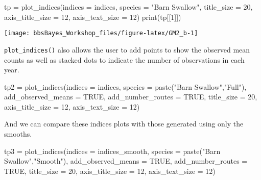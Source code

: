 \documentclass[
]{book}
\newenvironment{Shaded}{\begin{snugshade}}{\end{snugshade}}
\newcommand{\AttributeTok}[1]{\textcolor[rgb]{0.77,0.63,0.00}{#1}}
\newcommand{\ConstantTok}[1]{\textcolor[rgb]{0.00,0.00,0.00}{#1}}
\newcommand{\DecValTok}[1]{\textcolor[rgb]{0.00,0.00,0.81}{#1}}
\newcommand{\FunctionTok}[1]{\textcolor[rgb]{0.00,0.00,0.00}{#1}}
\newcommand{\NormalTok}[1]{#1}
\newcommand{\OtherTok}[1]{\textcolor[rgb]{0.56,0.35,0.01}{#1}}
\newcommand{\StringTok}[1]{\textcolor[rgb]{0.31,0.60,0.02}{#1}}
\begin{document}
\begin{Shaded}
\begin{Highlighting}[]
\NormalTok{tp }\OtherTok{=} \FunctionTok{plot\_indices}\NormalTok{(}\AttributeTok{indices =}\NormalTok{ indices,}
                         \AttributeTok{species =} \StringTok{"Barn Swallow"}\NormalTok{,}
                  \AttributeTok{title\_size =} \DecValTok{20}\NormalTok{,}
                  \AttributeTok{axis\_title\_size =} \DecValTok{12}\NormalTok{,}
                  \AttributeTok{axis\_text\_size =} \DecValTok{12}\NormalTok{)}
\FunctionTok{print}\NormalTok{(tp[[}\DecValTok{1}\NormalTok{]])}
\end{Highlighting}
\end{Shaded}

\begin{center}\texttt{[image: bbsBayes\_Workshop\_files/figure-latex/GM2\_b-1]} \end{center}

\texttt{plot\_indices()} also allows the user to add points to show the observed mean counts as well as stacked dots to indicate the number of observations in each year.

\begin{Shaded}
\begin{Highlighting}[]
\NormalTok{tp2 }\OtherTok{=} \FunctionTok{plot\_indices}\NormalTok{(}\AttributeTok{indices =}\NormalTok{ indices,}
                         \AttributeTok{species =} \FunctionTok{paste}\NormalTok{(}\StringTok{"Barn Swallow"}\NormalTok{,}\StringTok{"Full"}\NormalTok{),}
                  \AttributeTok{add\_observed\_means =} \ConstantTok{TRUE}\NormalTok{,}
                  \AttributeTok{add\_number\_routes =} \ConstantTok{TRUE}\NormalTok{,}
                  \AttributeTok{title\_size =} \DecValTok{20}\NormalTok{,}
                  \AttributeTok{axis\_title\_size =} \DecValTok{12}\NormalTok{,}
                  \AttributeTok{axis\_text\_size =} \DecValTok{12}\NormalTok{)}
\end{Highlighting}
\end{Shaded}

And we can compare these indices plots with those generated using only the smooths.

\begin{Shaded}
\begin{Highlighting}[]
\NormalTok{tp3 }\OtherTok{=} \FunctionTok{plot\_indices}\NormalTok{(}\AttributeTok{indices =}\NormalTok{ indices\_smooth,}
                         \AttributeTok{species =} \FunctionTok{paste}\NormalTok{(}\StringTok{"Barn Swallow"}\NormalTok{,}\StringTok{"Smooth"}\NormalTok{),}
                  \AttributeTok{add\_observed\_means =} \ConstantTok{TRUE}\NormalTok{,}
                  \AttributeTok{add\_number\_routes =} \ConstantTok{TRUE}\NormalTok{,}
                  \AttributeTok{title\_size =} \DecValTok{20}\NormalTok{,}
                  \AttributeTok{axis\_title\_size =} \DecValTok{12}\NormalTok{,}
                  \AttributeTok{axis\_text\_size =} \DecValTok{12}\NormalTok{)}
\end{Highlighting}
\end{Shaded}
\end{document}
